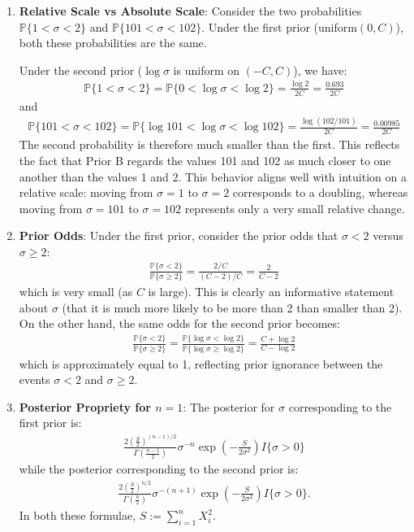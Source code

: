 \documentclass{scrartcl}
\renewcommand{\P}{{\mathbb P}}
\begin{document}
\begin{enumerate}
\item \textbf{Relative Scale vs Absolute Scale}: Consider the two
  probabilities $\P\{1 < \sigma < 2\}$ and $\P\{101 < \sigma <
  102\}$. Under the first prior (uniform$(0, C)$), both these
  probabilities are the same.

  Under the second prior ($\log \sigma$ is
  uniform on $(-C, C)$), we have:
  \begin{align*}
    \P\{1 < \sigma < 2\} = \P\{0 < \log \sigma < \log 2\} = \frac{\log
    2}{2C} = \frac{0.693}{2C}
  \end{align*}
  and
  \begin{align*}
    \P\{101 < \sigma < 102\} = \P\{\log 101 < \log \sigma < \log 102\}
    = \frac{\log(102/101)}{2C} = \frac{0.00985}{2C} 
  \end{align*}
  The second probability is therefore much smaller than the
  first. This reflects the fact that Prior B regards the values 101
  and 102 as much closer to one another than the values 1 and 2. This
  behavior aligns well with intuition on a relative scale: moving from
  $\sigma = 1$ to $\sigma = 2$ corresponds to a doubling, whereas
  moving from $\sigma = 101$ to $\sigma = 102$ represents only a very
  small relative change.

\item \textbf{Prior Odds}: Under the first prior, consider the prior
  odds that $\sigma < 2$ 
  versus $\sigma \geq 2$:
  \begin{align*}
    \frac{\P\{\sigma < 2\}}{\P\{\sigma \geq 2\}} = \frac{2/C}{(C-2)/C}
    = \frac{2}{C - 2}
  \end{align*}
  which is very small (as $C$ is large). This is clearly an
  informative statement about $\sigma$ (that it is much more likely to
  be more than 2 than smaller than 2). On the other hand, the same
  odds for the second prior becomes:
  \begin{align*}
    \frac{\P\{\sigma < 2\}}{\P\{\sigma \geq 2\}} = \frac{\P\{\log \sigma <
    \log 2\}}{\P\{\log \sigma \geq \log 2\}} = \frac{C + \log 2}{C -
    \log 2}
  \end{align*}
  which is approximately equal to 1, reflecting prior ignorance
  between the events $\sigma < 2$ and $\sigma \geq 2$.

\item \textbf{Posterior Propriety for $n = 1$}: The posterior for
  $\sigma$ corresponding to the first prior is: 
  \begin{align}\label{post1}
    \frac{2 \left(\frac{S}{2}
    \right)^{(n-1)/2}}{\Gamma\left(\frac{n-1}{2} \right)}
    \sigma^{-n} \exp \left(-\frac{S}{2 \sigma^2} \right) I\{\sigma > 0\}
  \end{align}
  while the posterior corresponding to the second prior is:
  \begin{align}
    \label{post2}
    \frac{2 \left(\frac{S}{2}
    \right)^{n/2}}{\Gamma\left(\frac{n}{2} \right)}
    \sigma^{-(n+1)} \exp \left(-\frac{S}{2 \sigma^2} \right) I\{\sigma >
    0\}. 
  \end{align}
  In both these formulae, $S := \sum_{i=1}^n X_i^2$. 
  

\end{enumerate}
\end{document}
